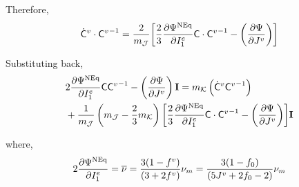 \documentclass{beamer}
\def\myPsi{{\mathrm{\Psi}}}
\def\myC{{\bf\mathsf{C}}}
\newcommand\lrB[1]{{\left[#1 \right]}}
\begin{document}
    \begin{frame}
        \begin{block}{Therefore,}
            \footnotesize\color{blue}\begin{align*}
                \dot{\myC}^v\cdot{\myC^v}^{-1}
                =
                \frac{2}{m_\mathcal{J}}\lrB{
                    \frac{2}{3}\del{\myPsi^{\rm NEq}}{I^e_1}{\myC}\cdot{\myC^v}^{-1}
                -
                \left({\del{\myPsi}{J^v}}\right)
                }
            \end{align*}
        \end{block}
        \begin{block}{Substituting back,}
            \footnotesize\begin{align*}
                & 2 \del{\myPsi^{\rm NEq}}{I^e_1}\myC{\myC^v}^{-1} -
                \left({\del{\myPsi}{J^v}}\right) {\bf I} = m_\mathcal{K}
                \left(
                    \dot{\myC}^v{\myC^v}^{-1}
                \right)
                \\ &+
                \frac{1}{m_\mathcal{J}}
                \lr{m_\mathcal{J}
                - \frac{2}{3}m_\mathcal{K}
                }\lrB{
                    \frac{2}{3}\del{\myPsi^{\rm NEq}}{I^e_1}{\myC}\cdot{\myC^v}^{-1}
                -
                \left({\del{\myPsi}{J^v}}\right)
                }{\bf I}
            \end{align*}
        \end{block}
        \begin{block}{where,}
            \footnotesize\begin{align*}
                2 \del{\myPsi^{\rm NEq}}{I^e_1} = \overline{\nu} 
                =
                \frac{3(1-f^v)}{(3+2f^v)}\nu_{m}
                =
                \frac{3(1 - f_0)}{(5 J^v + 2f_0  - 2)}\nu_m
            \end{align*}
        \end{block}
    \end{frame}
\end{document}
